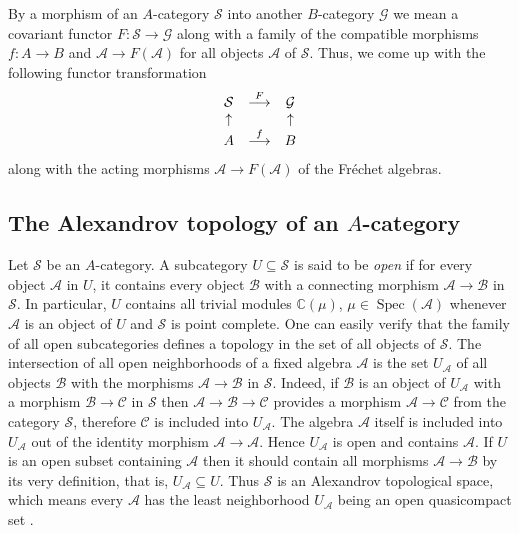 \documentclass[12pt]{amsart}%
\theoremstyle{plain}
\numberwithin{equation}{section}
\numberwithin{equation}{section}
\numberwithin{theorem}{section}
\numberwithin{lemma}{section}
\numberwithin{remark}{section}
\numberwithin{example}{section}
\numberwithin{proposition}{section}
\numberwithin{definition}{section}
\numberwithin{corollary}{section}
\begin{document}
By a morphism of an $A$-category $\mathcal{S}$ into another $B$-category
$\mathcal{G}$ we mean a covariant functor $F:\mathcal{S\rightarrow G}$ along
with a family of the compatible morphisms $f:A\rightarrow B$ and
$\mathcal{A}\rightarrow F\left(  \mathcal{A}\right)  $ for all objects
$\mathcal{A}$ of $\mathcal{S}$. Thus, we come up with the following functor
transformation
\[%
\begin{array}
[c]{ccc}%
\mathcal{S} & \overset{F}{\longrightarrow} & \mathcal{G}\\
\uparrow &  & \uparrow\\
A & \overset{f}{\longrightarrow} & B
\end{array}
\]
along with the acting morphisms $\mathcal{A}\rightarrow F\left(
\mathcal{A}\right)  $ of the Fr\'{e}chet algebras.

\subsection{The Alexandrov topology of an $A$-category\label{subsecAT}}

Let $\mathcal{S}$ be an $A$-category. A subcategory $U\subseteq\mathcal{S}$ is
said to be \textit{open} if for every object $\mathcal{A}$ in $U$, it contains
every object $\mathcal{B}$ with a connecting morphism $\mathcal{A\rightarrow
B}$ in $\mathcal{S}$. In particular, $U$ contains all trivial modules
$\mathbb{C}\left(  \mu\right)  $, $\mu\in\operatorname{Spec}\left(
\mathcal{A}\right)  $ whenever $\mathcal{A}$ is an object of $U$ and
$\mathcal{S}$ is point complete. One can easily verify that the family of all
open subcategories defines a topology in the set of all objects of
$\mathcal{S}$. The intersection of all open neighborhoods of a fixed algebra
$\mathcal{A}$ is the set $U_{\mathcal{A}}$ of all objects $\mathcal{B}$ with
the morphisms $\mathcal{A\rightarrow B}$ in $\mathcal{S}$. Indeed, if
$\mathcal{B}$ is an object of $U_{\mathcal{A}}$ with a morphism
$\mathcal{B\rightarrow C}$ in $\mathcal{S}$ then $\mathcal{A\rightarrow
B\rightarrow C}$ provides a morphism $\mathcal{A\rightarrow C}$ from the
category $\mathcal{S}$, therefore $\mathcal{C}$ is included into
$U_{\mathcal{A}}$. The algebra $\mathcal{A}$ itself is included into
$U_{\mathcal{A}}$ out of the identity morphism $\mathcal{A\rightarrow A}$.
Hence $U_{\mathcal{A}}$ is open and contains $\mathcal{A}$. If $U$ is an open
subset containing $\mathcal{A}$ then it should contain all morphisms
$\mathcal{A\rightarrow B}$ by its very definition, that is, $U_{\mathcal{A}%
}\subseteq U$. Thus $\mathcal{S}$ is an Alexandrov topological space, which
means every $\mathcal{A}$ has the least neighborhood $U_{\mathcal{A}}$ being
an open quasicompact set \cite{Spe}.
\end{document}

